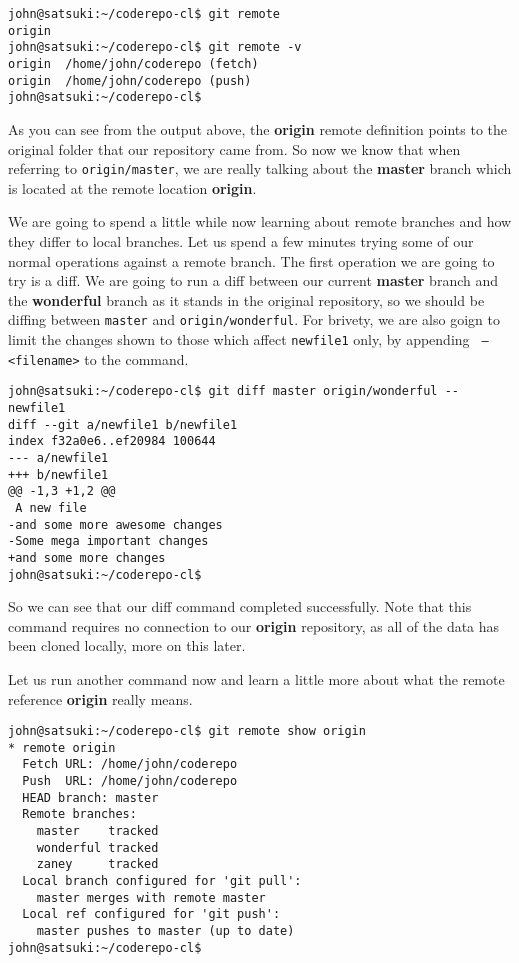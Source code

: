 \begin{Verbatim}[frame=leftline,framerule=1mm,fontsize=\relsize{-3}] 
john@satsuki:~/coderepo-cl$ git remote
origin
john@satsuki:~/coderepo-cl$ git remote -v
origin	/home/john/coderepo (fetch)
origin	/home/john/coderepo (push)
john@satsuki:~/coderepo-cl$ 
\end{Verbatim}

As you can see from the output above, the \textbf{origin} remote definition points to the original folder that our repository came from.  So now we know that when referring to \texttt{origin/master}, we are really talking about the \textbf{master} branch which is located at the remote location \textbf{origin}.

We are going to spend a little while now learning about remote branches and how they differ to local branches.  Let us spend a few minutes trying some of our normal operations against a remote branch.  The first operation we are going to try is a diff.  We are going to run a diff between our current \textbf{master} branch and the \textbf{wonderful} branch as it stands in the original repository, so we should be diffing between \texttt{master} and \texttt{origin/wonderful}.  For brivety, we are also goign to limit the changes shown to those which affect \texttt{newfile1} only, by appending \texttt{ -- <filename>} to the command.

\begin{Verbatim}[frame=leftline,framerule=1mm,fontsize=\relsize{-3}] 
john@satsuki:~/coderepo-cl$ git diff master origin/wonderful -- newfile1
diff --git a/newfile1 b/newfile1
index f32a0e6..ef20984 100644
--- a/newfile1
+++ b/newfile1
@@ -1,3 +1,2 @@
 A new file
-and some more awesome changes
-Some mega important changes
+and some more changes
john@satsuki:~/coderepo-cl$ 
\end{Verbatim}

So we can see that our diff command completed successfully.  Note that this command requires no connection to our \textbf{origin} repository, as all of the data has been cloned locally, more on this later.  

Let us run another command now and learn a little more about what the remote reference \textbf{origin} really means.

\begin{Verbatim}[frame=leftline,framerule=1mm,fontsize=\relsize{-3}] 
john@satsuki:~/coderepo-cl$ git remote show origin
* remote origin
  Fetch URL: /home/john/coderepo
  Push  URL: /home/john/coderepo
  HEAD branch: master
  Remote branches:
    master    tracked
    wonderful tracked
    zaney     tracked
  Local branch configured for 'git pull':
    master merges with remote master
  Local ref configured for 'git push':
    master pushes to master (up to date)
john@satsuki:~/coderepo-cl$ 
\end{Verbatim}

